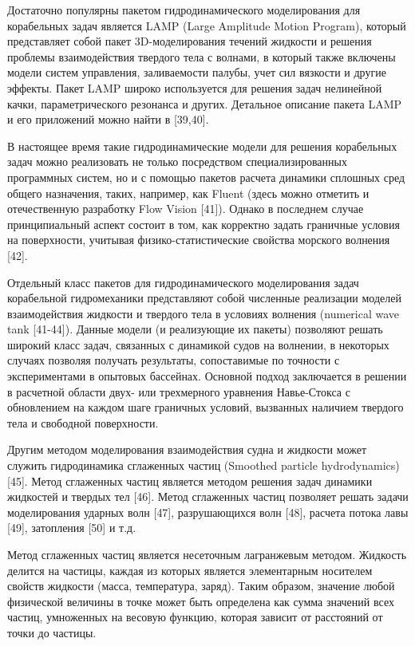 Достаточно популярны пакетом гидродинамического моделирования для корабельных задач является LAMP (Large Amplitude Motion Program), который представляет собой пакет 3D-моделирования течений жидкости и решения проблемы взаимодействия твердого тела с волнами, в который также включены модели систем управления, заливаемости палубы, учет сил вязкости и другие эффекты. Пакет LAMP широко используется для решения задач нелинейной качки, параметрического резонанса и других. Детальное описание пакета LAMP и его приложений можно найти в [39,40]. 

В настоящее время такие гидродинамические модели для решения корабельных задач можно реализовать не только посредством специализированных программных систем, но и с помощью пакетов расчета динамики сплошных сред общего назначения, таких, например, как Fluent (здесь можно отметить и отечественную разработку Flow Vision [41]). Однако в последнем случае принципиальный аспект состоит в том, как корректно задать граничные условия на поверхности, учитывая физико-статистические свойства морского волнения [42].

Отдельный класс пакетов для гидродинамического моделирования задач корабельной гидромеханики представляют собой численные реализации моделей взаимодействия жидкости и твердого тела в условиях волнения (numerical wave tank [41-44]). Данные модели (и реализующие их пакеты) позволяют решать широкий класс задач, связанных с динамикой судов на волнении, в некоторых случаях позволяя получать результаты, сопоставимые по точности с экспериментами в опытовых бассейнах. Основной подход заключается в решении в расчетной области двух- или трехмерного уравнения Навье-Стокса с обновлением на каждом шаге граничных условий, вызванных наличием твердого тела и свободной поверхности.

Другим методом моделирования взаимодействия судна и жидкости может служить гидродинамика сглаженных частиц (Smoothed particle hydrodynamics) [45]. Метод сглаженных частиц является методом решения задач динамики жидкостей и твердых тел [46]. Метод сглаженных частиц позволяет решать задачи моделирования ударных волн [47], разрушающихся волн [48], расчета потока лавы [49], затопления [50] и т.д.

Метод сглаженных частиц является несеточным лагранжевым методом. Жидкость делится на частицы, каждая из которых является элементарным носителем свойств жидкости (масса, температура, заряд). Таким образом, значение любой физической величины в точке может быть определена как сумма значений всех частиц, умноженных на весовую функцию, которая зависит от расстояний от точки до частицы.

